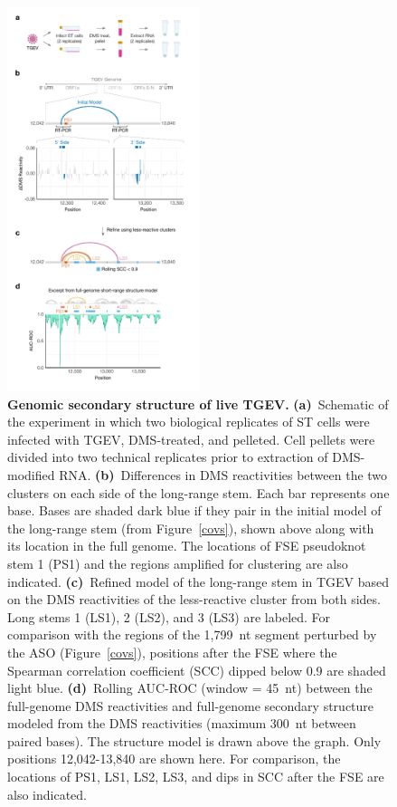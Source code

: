 \documentclass[main.tex]{subfiles}
\begin{document}
\begin{figure}[H]
	\includegraphics[width=0.5\textwidth]{../MainFigures/tgev/tgev.pdf}
	\caption{\textbf{Genomic secondary structure of live TGEV.} \textbf{(a)}~Schematic of the experiment in which two biological replicates of ST cells were infected with TGEV, DMS-treated, and pelleted. Cell pellets were divided into two technical replicates prior to extraction of DMS-modified RNA. \textbf{(b)}~Differences in DMS reactivities between the two clusters on each side of the long-range stem. Each bar represents one base. Bases are shaded dark blue if they pair in the initial model of the long-range stem (from Figure~\ref{covs}), shown above along with its location in the full genome. The locations of FSE pseudoknot stem 1 (PS1) and the regions amplified for clustering are also indicated. \textbf{(c)}~Refined model of the long-range stem in TGEV based on the DMS reactivities of the less-reactive cluster from both sides. Long stems 1 (LS1), 2 (LS2), and 3 (LS3) are labeled. For comparison with the regions of the 1,799~nt segment perturbed by the ASO (Figure~\ref{covs}), positions after the FSE where the Spearman correlation coefficient (SCC) dipped below 0.9 are shaded light blue. \textbf{(d)}~Rolling AUC-ROC (window = 45~nt) between the full-genome DMS reactivities and full-genome secondary structure modeled from the DMS reactivities (maximum 300~nt between paired bases). The structure model is drawn above the graph. Only positions 12,042-13,840 are shown here. For comparison, the locations of PS1, LS1, LS2, LS3, and dips in SCC after the FSE are also indicated.}
	\label{tgev}
\end{figure}
\end{document}
